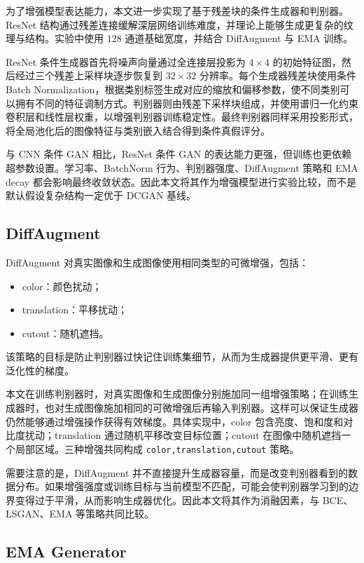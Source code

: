 \documentclass[UTF8,a4paper,12pt]{ctexart}
\begin{document}
为了增强模型表达能力，本文进一步实现了基于残差块的条件生成器和判别器。ResNet 结构通过残差连接缓解深层网络训练难度，并理论上能够生成更复杂的纹理与结构。实验中使用 128 通道基础宽度，并结合 DiffAugment 与 EMA 训练。


ResNet 条件生成器首先将噪声向量通过全连接层投影为 $4\times4$ 的初始特征图，然后经过三个残差上采样块逐步恢复到 $32\times32$ 分辨率。每个生成器残差块使用条件 Batch Normalization，根据类别标签生成对应的缩放和偏移参数，使不同类别可以拥有不同的特征调制方式。判别器则由残差下采样块组成，并使用谱归一化约束卷积层和线性层权重，以增强判别器训练稳定性。最终判别器同样采用投影形式，将全局池化后的图像特征与类别嵌入结合得到条件真假评分。


与 CNN 条件 GAN 相比，ResNet 条件 GAN 的表达能力更强，但训练也更依赖超参数设置。学习率、BatchNorm 行为、判别器强度、DiffAugment 策略和 EMA decay 都会影响最终收敛状态。因此本文将其作为增强模型进行实验比较，而不是默认假设复杂结构一定优于 DCGAN 基线。


\subsection{DiffAugment}

DiffAugment 对真实图像和生成图像使用相同类型的可微增强，包括：


\begin{itemize}
\item color：颜色扰动；
\item translation：平移扰动；
\item cutout：随机遮挡。
\end{itemize}


该策略的目标是防止判别器过快记住训练集细节，从而为生成器提供更平滑、更有泛化性的梯度。


本文在训练判别器时，对真实图像和生成图像分别施加同一组增强策略；在训练生成器时，也对生成图像施加相同的可微增强后再输入判别器。这样可以保证生成器仍然能够通过增强操作获得有效梯度。具体实现中，color 包含亮度、饱和度和对比度扰动；translation 通过随机平移改变目标位置；cutout 在图像中随机遮挡一个局部区域。三种增强共同构成 \texttt{color,translation,cutout} 策略。


需要注意的是，DiffAugment 并不直接提升生成器容量，而是改变判别器看到的数据分布。如果增强强度或训练目标与当前模型不匹配，可能会使判别器学习到的边界变得过于平滑，从而影响生成器优化。因此本文将其作为消融因素，与 BCE、LSGAN、EMA 等策略共同比较。


\subsection{EMA Generator}
\end{document}
